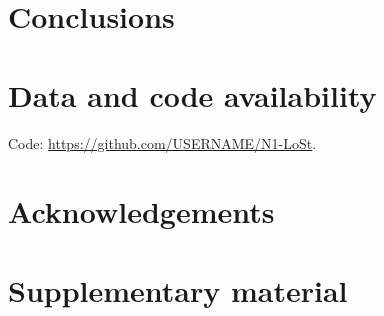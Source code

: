 \documentclass[11pt,a4paper]{article}
\begin{document}
\section{Conclusions}\label{sec:conclusions}


\section*{Data and code availability}
Code: \url{https://github.com/USERNAME/N1-LoSt}.


\section*{Acknowledgements}




\appendix
\section{Supplementary material}\label{sec:appendix}
\end{document}
